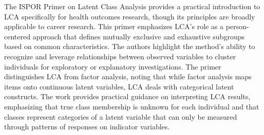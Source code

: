 \documentclass[main.tex]{subfiles}
\begin{document}
The ISPOR Primer on Latent Class Analysis provides a practical introduction to LCA specifically for health outcomes research, though its principles are broadly applicable to career research\parencite{ispor2016}. This primer emphasizes LCA's role as a person-centered approach that defines mutually exclusive and exhaustive subgroups based on common characteristics. The authors highlight the method's ability to recognize and leverage relationships between observed variables to cluster individuals for exploratory or explanatory investigations. The primer distinguishes LCA from factor analysis, noting that while factor analysis maps items onto continuous latent variables, LCA deals with categorical latent constructs. The work provides practical guidance on interpreting LCA results, emphasizing that true class membership is unknown for each individual and that classes represent categories of a latent variable that can only be measured through patterns of responses on indicator variables.
\end{document}
